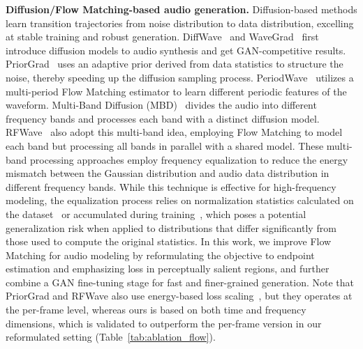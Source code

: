 \documentclass{article} %
\begin{document}
\noindent\textbf{Diffusion/Flow Matching-based audio generation.}
Diffusion-based methods learn transition trajectories from noise distribution to data distribution, excelling at stable training and robust generation. 
DiffWave~\citep{diffwave} and WaveGrad~\citep{Wavegrad} first introduce diffusion models to audio synthesis and get GAN-competitive results. PriorGrad~\citep{priorgrad} uses an adaptive prior derived from data statistics to structure the noise, thereby speeding up the diffusion sampling process. 
PeriodWave~\citep{periodwave} utilizes a multi-period Flow Matching estimator to learn different periodic features of the waveform.
Multi-Band Diffusion (MBD)~\citep{mbd} divides the audio into different frequency bands and processes each band with a distinct diffusion model. RFWave~\citep{rfwave} also adopt this multi-band idea, employing Flow Matching to model each band but processing all bands in parallel with a shared model. These multi-band processing approaches employ frequency equalization to reduce the energy mismatch between the Gaussian distribution and audio data distribution in different frequency bands. While this technique is effective for high-frequency modeling, the equalization process relies on normalization statistics calculated on the dataset~\citep{mbd} or accumulated during training~\citep{rfwave}, which poses a potential generalization risk when applied to distributions that differ significantly from those used to compute the original statistics. 
In this work, we improve Flow Matching for audio modeling by reformulating the objective to endpoint estimation and emphasizing loss in perceptually salient regions, and further combine a GAN fine-tuning stage for fast and finer-grained generation. Note that PriorGrad and RFWave also use energy-based loss scaling~\citep{rfwave}, but they operates at the per-frame level, whereas ours is based on both time and frequency dimensions, which is validated to outperform the per-frame version in our reformulated setting (Table~\ref{tab:ablation_flow}).
\end{document}
